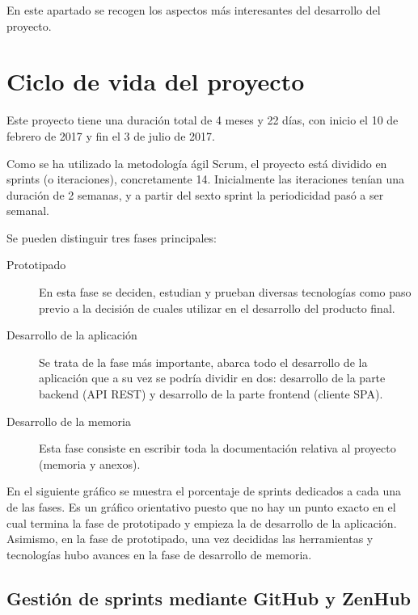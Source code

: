 
En este apartado se recogen los aspectos más interesantes del desarrollo del proyecto.

\section{Ciclo de vida del proyecto}

Este proyecto tiene una duración total de 4 meses y 22 días, con inicio el 10 de febrero de 2017 y fin el 3 de julio de 2017.

Como se ha utilizado la metodología ágil Scrum, el proyecto está dividido en sprints (o iteraciones), concretamente 14. Inicialmente las iteraciones tenían una duración de 2 semanas, y a partir del sexto sprint la periodicidad pasó a ser semanal.

Se pueden distinguir tres fases principales:

\begin{description}
	\item[Prototipado] En esta fase se deciden, estudian y prueban diversas tecnologías como paso previo a la decisión de cuales utilizar en el desarrollo del producto final.
	\item[Desarrollo de la aplicación] Se trata de la fase más importante, abarca todo el desarrollo de la aplicación que a su vez se podría dividir en dos: desarrollo de la parte backend (API REST) y desarrollo de la parte frontend (cliente SPA).
	\item[Desarrollo de la memoria] Esta fase consiste en escribir toda la documentación relativa al proyecto (memoria y anexos).
\end{description}

En el siguiente gráfico se muestra el porcentaje de sprints dedicados a cada una de las fases. Es un gráfico orientativo puesto que no hay un punto exacto en el cual termina la fase de prototipado y empieza la de desarrollo de la aplicación. Asimismo, en la fase de prototipado, una vez decididas las herramientas y tecnologías hubo avances en la fase de desarrollo de memoria.


\subsection{Gestión de sprints mediante GitHub y ZenHub}

